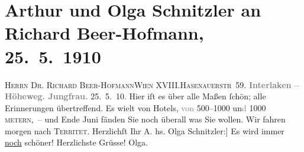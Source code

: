 

         
         \renewcommand{\erwaehntePersonen}{Personen: Richard Beer-Hofmann}
         \renewcommand{\erwaehnteOrte}{Orte: Hasenauerstraße, Höheweg, Interlaken, Jungfrau, Territet, Wien, XVIII., Währing}
         \renewcommand{\erwaehnteWerke}{}
               \section[Arthur und Olga Schnitzler an Richard Beer-Hofmann, 25. 5. 1910]{ Arthur und Olga Schnitzler an Richard Beer-Hofmann, 25. 5. 1910}\nopagebreak{}\rehead{ }\begin{ledgroupsized}[t]{13cm}\normalsize\beginnumbering \toendnotes[C]{\smallbreak\pagebreak[2]} 
\pstart{}{\pb}\textsc{Herrn Dr. Richard Beer-Hofmann}\pend{}\pstart{}\textsc{Wien XVIII.}\pend{}\pstart{}\textsc{Hasenauerstr 59}.\pend{}{\bigskip}\pstart
           \noindent{}\centering{}{\pb}\textcolor{gray}{\textbf{Interlaken – Höheweg. Jungfrau.}}\pend
           \pstart
           \raggedleft{}25. 5. 10.\pend
           \pstart
           {\pb}Hier iſt es über alle Maßen ſchön; alle Erinnerungen
               übertreffend. Es wi{\geminationm}elt von Hotels,
                  \textcolor{gray}{von} 500–1000 un\textcolor{gray}{d} 1000 \textsc{metern}, – und Ende Juni fänden Sie \introOben{}noch\introOben{} überall was Sie wollen. Wir fahren morgen nach \textsc{Territet}.\pend
           \pstart Herzlichſt Ihr \spacefill\mbox{A.}\pend{}\pstart
           \noindent{}{[}hs. Olga Schnitzler:{]} Es wird immer \uline{noch}
               schöner!\pend
           \pstart Herzlichste Grüsse! \spacefill\mbox{Olga.}\pend{}
         
         \endnumbering{}\end{ledgroupsized}  \newcommand{\dateiname}{L01934}\newcommand{\titel}{Arthur und Olga Schnitzler an Richard Beer-Hofmann, 25. 5. 1910}\newcommand{\editorInnen}{Martin Anton Müller und Gerd-Hermann Susen}
      